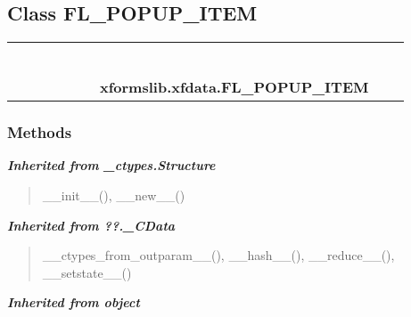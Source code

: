 \subsection{Class FL\_POPUP\_ITEM}

    \label{xformslib:xfdata:FL_POPUP_ITEM}
\begin{tabular}{cccccccccc}
\multicolumn{2}{r}{\settowidth{\BCL}{object}\multirow{2}{\BCL}{object}}
&&
&&
&&
  \\\cline{3-3}
  &&\multicolumn{1}{c|}{}
&&
&&
&&
  \\
\multicolumn{4}{r}{\settowidth{\BCL}{??.\_CData}\multirow{2}{\BCL}{??.\_CData}}
&&
&&
  \\\cline{5-5}
  &&&&\multicolumn{1}{c|}{}
&&
&&
  \\
\multicolumn{6}{r}{\settowidth{\BCL}{\_ctypes.Structure}\multirow{2}{\BCL}{\_ctypes.Structure}}
&&
  \\\cline{7-7}
  &&&&&&\multicolumn{1}{c|}{}
&&
  \\
&&&&&&\multicolumn{2}{l}{\textbf{xformslib.xfdata.FL\_POPUP\_ITEM}}
\end{tabular}



  \subsubsection{Methods}


\large{\textbf{\textit{Inherited from \_ctypes.Structure}}}

\begin{quote}
\_\_init\_\_(), \_\_new\_\_()
\end{quote}

\large{\textbf{\textit{Inherited from ??.\_CData}}}

\begin{quote}
\_\_ctypes\_from\_outparam\_\_(), \_\_hash\_\_(), \_\_reduce\_\_(), \_\_setstate\_\_()
\end{quote}

\large{\textbf{\textit{Inherited from object}}}

